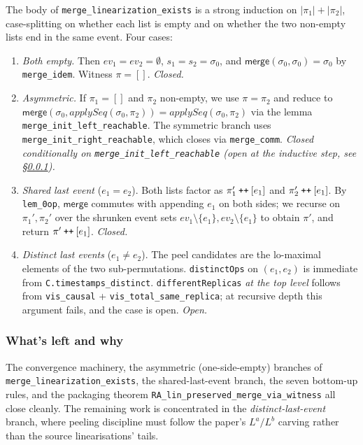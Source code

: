 \documentclass[11pt,a4paper]{article}
\theoremstyle{definition}
\theoremstyle{remark}
\newcommand{\mmerge}{\mathsf{merge}}
\newcommand{\ev}{\mathit{ev}}
\newcommand{\init}{\sigma_0}
\begin{document}
The body of \texttt{merge\_linearization\_exists} is a strong
induction on $|\pi_1| + |\pi_2|$, case-splitting on whether each
list is empty and on whether the two non-empty lists end in the
same event. Four cases:
\begin{enumerate}[leftmargin=*]
  \item \emph{Both empty.} Then $\ev_1 = \ev_2 = \emptyset$,
    $s_1 = s_2 = \init$, and $\mmerge(\init, \init) = \init$ by
    \texttt{merge\_idem}. Witness $\pi = []$. \emph{Closed.}
  \item \emph{Asymmetric.} If $\pi_1 = []$ and $\pi_2$ non-empty,
    we use $\pi = \pi_2$ and reduce to
    $\mmerge(\init, \mathit{applySeq}(\init, \pi_2)) = \mathit{applySeq}(\init, \pi_2)$
    via the lemma \texttt{merge\_init\_left\_reachable}. The
    symmetric branch uses
    \texttt{merge\_init\_right\_reachable}, which closes via
    \texttt{merge\_comm}. \emph{Closed conditionally on
    \texttt{merge\_init\_left\_reachable} (open at the inductive
    step, see \S\ref{sec:merge-whats-left}).}
  \item \emph{Shared last event} ($e_1 = e_2$). Both lists
    factor as $\pi_1' \mathbin{\text{\tt ++}} [e_1]$ and
    $\pi_2' \mathbin{\text{\tt ++}} [e_1]$. By \texttt{lem\_0op},
    $\mmerge$ commutes with appending $e_1$ on both sides; we
    recurse on $\pi_1', \pi_2'$ over the shrunken event sets
    $\ev_1 \setminus \{e_1\}, \ev_2 \setminus \{e_1\}$ to obtain
    $\pi'$, and return $\pi' \mathbin{\text{\tt ++}} [e_1]$.
    \emph{Closed.}
  \item \emph{Distinct last events} ($e_1 \neq e_2$). The peel
    candidates are the lo-maximal elements of the two
    sub-permutations. \texttt{distinctOps} on $(e_1, e_2)$ is
    immediate from \texttt{C.timestamps\_distinct}.
    \texttt{differentReplicas} \emph{at the top level} follows
    from \texttt{vis\_causal} + \texttt{vis\_total\_same\_replica};
    at recursive depth this argument fails, and the case is
    open. \emph{Open.}
\end{enumerate}

\subsubsection{What's left and why}
\label{sec:merge-whats-left}

The convergence machinery, the asymmetric (one-side-empty)
branches of \texttt{merge\_linearization\_exists}, the
shared-last-event branch, the seven bottom-up rules, and the
packaging theorem \texttt{RA\_lin\_preserved\_merge\_via\_witness}
all close cleanly. The remaining work is concentrated in the
\emph{distinct-last-event} branch, where peeling discipline must
follow the paper's $L^a / L^b$ carving rather than the source
linearisations' tails.
\end{document}
